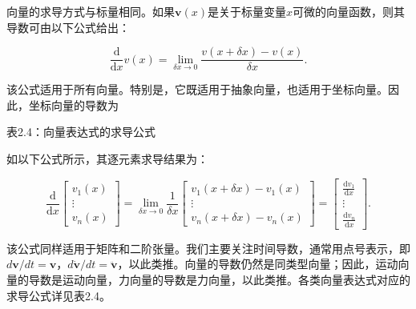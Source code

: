 \documentclass[10pt,a4paper]{book}
\theoremstyle{thmstyle} %
\theoremstyle{defstyle} %
\theoremstyle{prostyle} %
\begin{document}
向量的求导方式与标量相同。如果$\boldsymbol{v}(x)$是关于标量变量$x$可微的向量函数，则其导数可由以下公式给出：



$$
\frac { \mathrm { d } } { \mathrm { d } x } v ( x ) = \operatorname* { l i m } _ { \delta x \to 0 } \frac { v ( x + \delta x ) - v ( x ) } { \delta x } .
$$  



该公式适用于所有向量。特别是，它既适用于抽象向量，也适用于坐标向量。因此，坐标向量的导数为



表2.4：向量表达式的求导公式





如以下公式所示，其逐元素求导结果为：



$$
\frac { \mathrm { d } } { \mathrm { d } x } \left[ \begin{array}{l} { v _ { 1 } ( x ) } \\{ \vdots } \\{ v _ { n } ( x ) } \end{array} \right] = \operatorname* { l i m } _ { \delta x \to 0 } \frac { 1 } { \delta x } \left[ \begin{array}{l} { v _ { 1 } ( x + \delta x ) - v _ { 1 } ( x ) } \\{ \vdots } \\{ v _ { n } ( x + \delta x ) - v _ { n } ( x ) } \end{array} \right] = \left[ \begin{array}{l} { \frac { \mathrm { d } v _ { 1 } } { \mathrm { d } x } } \\{ \vdots } \\{ \frac { \mathrm { d } v _ { n } } { \mathrm { d } x } } \end{array} \right] .
$$



该公式同样适用于矩阵和二阶张量。我们主要关注时间导数，通常用点号表示，即 $d\boldsymbol{v}/dt = \boldsymbol{v}$，$d\dot{\boldsymbol{v}}/dt = \ddot{\boldsymbol{v}}$，以此类推。向量的导数仍然是同类型向量；因此，运动向量的导数是运动向量，力向量的导数是力向量，以此类推。各类向量表达式对应的求导公式详见表2.4。
\end{document}
